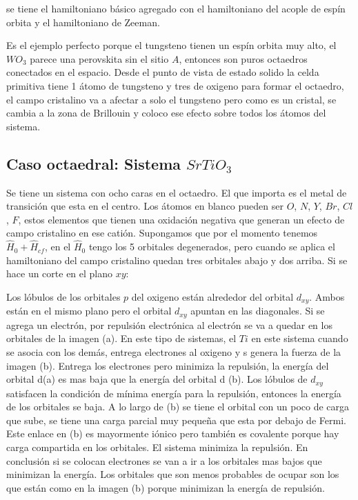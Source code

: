 \documentclass[11pt,fleqn]{book}
\begin{document}
se tiene el hamiltoniano básico agregado con el hamiltoniano del acople de espín orbita y el hamiltoniano de Zeeman.

\begin{example}[$WO_{3}$]
Es el ejemplo perfecto porque el tungsteno tienen un espín orbita muy alto, el $WO_{3}$ parece una perovskita sin el sitio $A$, entonces son puros octaedros conectados en el espacio. Desde el punto de vista de estado solido la celda primitiva tiene 1 átomo de tungsteno y tres de oxigeno para formar el octaedro, el campo cristalino va a afectar a solo el tungsteno pero como es un cristal, se cambia a la zona de Brillouin y coloco ese efecto sobre todos los átomos del sistema.
\end{example}

\subsection{Caso octaedral: Sistema $SrTiO_{3}$}


Se tiene un sistema con ocho caras en el octaedro. El que importa es el metal de transición que esta en el centro. Los átomos en blanco pueden ser $O$, $N$, $Y$, $Br$, $Cl$, $F$, estos elementos que tienen una oxidación negativa que generan un efecto de campo cristalino en ese catión. Supongamos que por el momento tenemos $\hat{H}_{0}+ \hat{H}_{cf}$, en el $\hat{H}_{0}$ tengo los 5 orbitales degenerados, pero cuando se aplica el hamiltoniano del campo cristalino quedan tres orbitales abajo y dos arriba. Si se hace un corte en el plano $xy$:


Los lóbulos de los orbitales $p$ del oxigeno están alrededor del orbital $d_{xy}$. Ambos están en el mismo plano pero el orbital $d_{xy}$ apuntan en las diagonales. Si se agrega un electrón, por repulsión electrónica al electrón se va a quedar en los  orbitales de la imagen (a). En este tipo de sistemas, el $Ti$  en este sistema cuando se asocia con los demás, entrega electrones al oxigeno y s genera la fuerza de la imagen (b). Entrega los electrones pero minimiza la repulsión, la energía del orbital d(a) es mas baja que la energía del orbital d (b). Los lóbulos de $d_{xy}$ satisfacen la condición de mínima energía para la repulsión, entonces la energía de los orbitales se baja. A lo largo de (b) se tiene el orbital con un poco de carga que sube, se tiene una carga parcial muy pequeña que esta por debajo de Fermi. Este enlace en (b) es mayormente iónico pero también es covalente porque hay carga compartida en los orbitales. El sistema minimiza la repulsión. En conclusión si se colocan electrones se van a ir a los orbitales mas bajos que minimizan la energía. Los orbitales que son menos probables de ocupar son los que están como en la imagen (b) porque minimizan la energía de repulsión.
\end{document}
